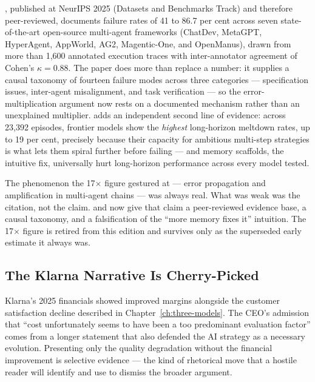 \textcite{Cemri2025}, published at NeurIPS 2025 (Datasets and Benchmarks Track) and therefore peer-reviewed, documents failure rates of 41 to 86.7 per cent across seven state-of-the-art open-source multi-agent frameworks (ChatDev, MetaGPT, HyperAgent, AppWorld, AG2, Magentic-One, and OpenManus), drawn from more than 1,600 annotated execution traces with inter-annotator agreement of Cohen's $\kappa = 0.88$. The paper does more than replace a number: it supplies a causal taxonomy of fourteen failure modes across three categories --- specification issues, inter-agent misalignment, and task verification --- so the error-multiplication argument now rests on a documented mechanism rather than an unexplained multiplier. \parencite{Khanal2026} adds an independent second line of evidence: across 23,392 episodes, frontier models show the \emph{highest} long-horizon meltdown rates, up to 19 per cent, precisely because their capacity for ambitious multi-step strategies is what lets them spiral further before failing --- and memory scaffolds, the intuitive fix, universally hurt long-horizon performance across every model tested.

\begin{cautionbox}[title={What Changed}]
The phenomenon the 17$\times$ figure gestured at --- error propagation and amplification in multi-agent chains --- was always real. What was weak was the citation, not the claim. \parencite{Cemri2025} and \parencite{Khanal2026} now give that claim a peer-reviewed evidence base, a causal taxonomy, and a falsification of the ``more memory fixes it'' intuition. The 17$\times$ figure is retired from this edition and survives only as the superseded early estimate it always was.
\end{cautionbox}

\subsection{The Klarna Narrative Is Cherry-Picked}

Klarna's 2025 financials showed improved margins alongside the customer satisfaction decline described in Chapter~\ref{ch:three-models}. The CEO's admission that ``cost unfortunately seems to have been a too predominant evaluation factor'' \parencite{Klarna2025} comes from a longer statement that also defended the AI strategy as a necessary evolution. Presenting only the quality degradation without the financial improvement is selective evidence --- the kind of rhetorical move that a hostile reader will identify and use to dismiss the broader argument.

